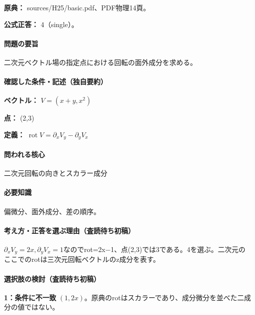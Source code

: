 \noindent\textbf{原典：} sources/H25/basic.pdf、PDF物理14頁。

\textbf{公式正答：} 4（single）。

\paragraph{問題の要旨} 二次元ベクトル場の指定点における回転の面外成分を求める。

\paragraph{確認した条件・記述（独自要約）}\mbox{}\par

\noindent\textbf{ベクトル：} \(V=(x+y,x^2)\)\par

\noindent\textbf{点：} (2,3)\par

\noindent\textbf{定義：} \(\operatorname{rot}V=\partial_xV_y-\partial_yV_x\)\par

\paragraph{問われる核心} 二次元回転の向きとスカラー成分

\paragraph{必要知識} 偏微分、面外成分、差の順序。

\paragraph{考え方・正答を選ぶ理由（査読待ち初稿）} \(\partial_xV_y=2x,\partial_yV_x=1\)なのでrot=\allowbreak{}2x−1、点(2,3)では3である。4を選ぶ。二次元のここでのrotは三次元回転ベクトルのz成分を表す。

\paragraph{選択肢の検討（査読待ち初稿）}\mbox{}\par

\noindent\textbf{1：条件に不一致} \((1,2x)\)。原典のrotはスカラーであり、成分微分を並べた二成分の値ではない。\par

